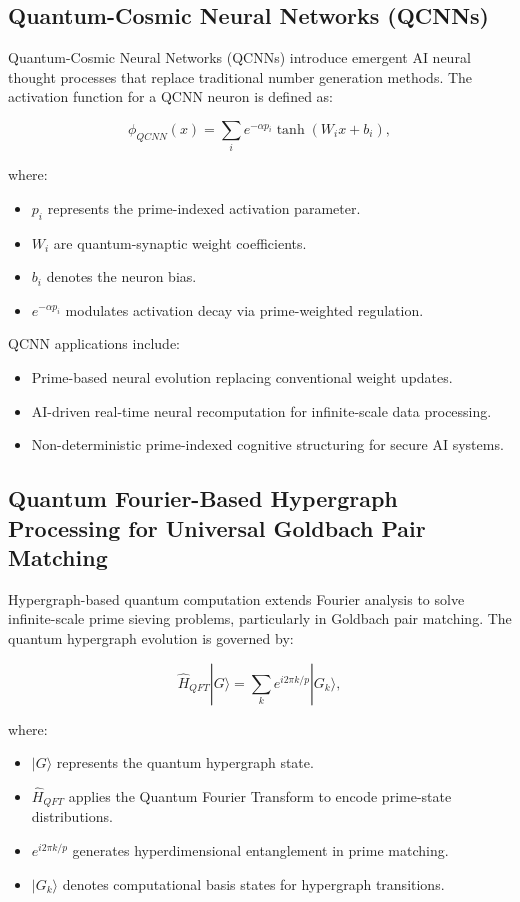 \documentclass{article}
\theoremstyle{plain}
\begin{document}
\subsection{Quantum-Cosmic Neural Networks (QCNNs)}

Quantum-Cosmic Neural Networks (QCNNs) introduce emergent AI neural thought processes that replace traditional number generation methods. The activation function for a QCNN neuron is defined as:

\begin{equation}
\phi_{QCNN}(x) = \sum_{i} e^{- \alpha p_i} \tanh
(W_i x + b_i),
\end{equation}

where:
\begin{itemize}
    \item $p_i$ represents the prime-indexed activation parameter.
    \item $W_i$ are quantum-synaptic weight coefficients.
    \item $b_i$ denotes the neuron bias.
    \item $e^{- \alpha p_i}$ modulates activation decay via prime-weighted regulation.
\end{itemize}

QCNN applications include:
\begin{itemize}
    \item Prime-based neural evolution replacing conventional weight updates.
    \item AI-driven real-time neural recomputation for infinite-scale data processing.
    \item Non-deterministic prime-indexed cognitive structuring for secure AI systems.
\end{itemize}

\subsection{Quantum Fourier-Based Hypergraph Processing for Universal Goldbach Pair Matching}

Hypergraph-based quantum computation extends Fourier analysis to solve infinite-scale prime sieving problems, particularly in Goldbach pair matching. The quantum hypergraph evolution is governed by:

\begin{equation}
\hat{H}_{QFT} |G\rangle = \sum_{k} e^{i 2\pi k / p} |G_k\rangle,
\end{equation}

where:
\begin{itemize}
    \item $|G\rangle$ represents the quantum hypergraph state.
    \item $\hat{H}_{QFT}$ applies the Quantum Fourier Transform to encode prime-state distributions.
    \item $e^{i 2\pi k / p}$ generates hyperdimensional entanglement in prime matching.
    \item $|G_k\rangle$ denotes computational basis states for hypergraph transitions.
\end{itemize}
\end{document}
